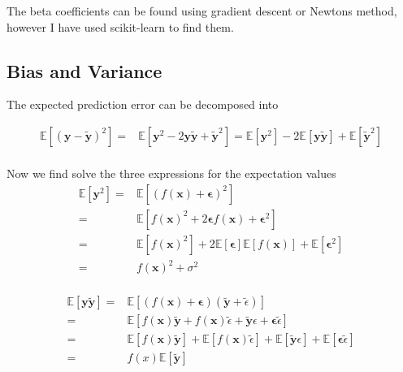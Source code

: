 \documentclass[a4paper,12pt]{article}
\begin{document}
\noindent
The beta coefficients can be found using gradient descent or Newtons method, however I have used scikit-learn to find them.















\subsection{Bias and Variance}
The expected prediction error can be decomposed into

\begin{equation} \label{eq1}
\begin{split}
\mathbb{E}\left[(\boldsymbol{y}-\boldsymbol{\tilde{y}})^2\right]=&\mathbb{E}[\boldsymbol{y}^2-2\boldsymbol{y}\boldsymbol{\tilde{y}}+\boldsymbol{\tilde{y}}^2]=\mathbb{E}[\boldsymbol{y}^2]-2\mathbb{E}[\boldsymbol{y}\boldsymbol{\tilde{y}}]+\mathbb{E}[\boldsymbol{\tilde{y}}^2]\\
\end{split}
\end{equation}

Now we find solve the three expressions for the expectation values
\begin{equation} 
\begin{split}
\mathbb{E}[\boldsymbol{y}^2]=&\mathbb{E}[(f(\boldsymbol{x}) + \boldsymbol{\epsilon})^2]\\
= &\mathbb{E}[f(\boldsymbol{x})^2 + 2\boldsymbol{\epsilon}f(\boldsymbol{x}) + \boldsymbol{\epsilon}^2]\\
= &\mathbb{E}[f(\boldsymbol{x})^2] + 2\mathbb{E}[\boldsymbol{\epsilon}]\mathbb{E}[f(\boldsymbol{x})] + \mathbb{E}[\boldsymbol{\epsilon}^2]\\
= &f(\boldsymbol{x})^2+\sigma^2 \\
\end{split}
\end{equation}


\begin{equation} 
\begin{split}
\mathbb{E}[\boldsymbol{y}\boldsymbol{\tilde{y}}]=&\mathbb{E}[(f(\boldsymbol{x}) + \boldsymbol{\epsilon})(\boldsymbol{\tilde{y}} + \tilde{\epsilon})]\\
= &\mathbb{E}[f(\boldsymbol{x})\boldsymbol{\tilde{y}} +f(\boldsymbol{x})\tilde{\epsilon} +\boldsymbol{\tilde{y}}{\epsilon} + \boldsymbol{\epsilon}\tilde{\epsilon}]\\
= &\mathbb{E}[f(\boldsymbol{x})\boldsymbol{\tilde{y}}] +\mathbb{E}[f(\boldsymbol{x})\tilde{\epsilon}] +\mathbb{E}[\boldsymbol{\tilde{y}}{\epsilon}] + \mathbb{E}[\boldsymbol{\epsilon}\tilde{\epsilon}]\\
= &{f({x})}\mathbb{E}[\boldsymbol{\tilde{y}}] \\
\end{split}
\end{equation}
\end{document}
